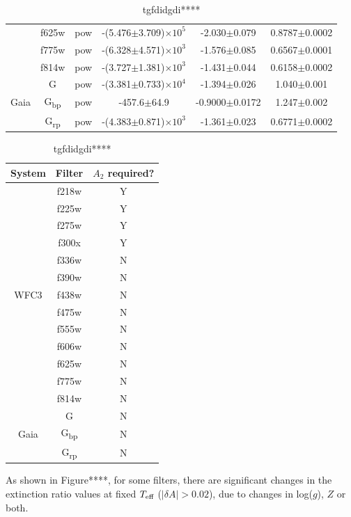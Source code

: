 \documentclass[12pt, a4paper]{report}
\begin{document}
\begin{table}
\begin{tabular}{cccccc}
& f625w & pow & -(5.476$\pm$3.709)$\times 10^{5}$ & -2.030$\pm$0.079 & 0.8787$\pm$0.0002 \\
& f775w & pow & -(6.328$\pm$4.571)$\times 10^{3}$ & -1.576$\pm$0.085 & 0.6567$\pm$0.0001 \\
& f814w & pow & -(3.727$\pm$1.381)$\times 10^{3}$ & -1.431$\pm$0.044 & 0.6158$\pm$0.0002 \\ \hline
& G & pow & -(3.381$\pm$0.733)$\times 10^{4}$ & -1.394$\pm$0.026 & 1.040$\pm$0.001 \\
Gaia & G\textsubscript{bp} & pow & -457.6$\pm$64.9 & -0.9000$\pm$0.0172 & 1.247$\pm$0.002 \\
& G\textsubscript{rp} & pow & -(4.383$\pm$0.871)$\times 10^{3}$ & -1.361$\pm$0.023 & 0.6771$\pm$0.0002 \\ \hline

\end{tabular}
\caption{tgfdidgdi****}
\label{R1_coeffs_table}
\end{table}

\begin{table}
\begin{tabular}{ccc}
\hline
System & Filter & $A_{2}$ required? \\
\hline
& f218w & Y \\
& f225w & Y \\
& f275w & Y \\
& f300x & Y \\
& f336w & N \\
& f390w & N \\
WFC3 & f438w & N \\
& f475w & N \\
& f555w & N \\
& f606w & N \\
& f625w & N \\
& f775w & N \\
& f814w & N \\
\hline
& G & N \\
Gaia & G\textsubscript{bp} & N \\
& G\textsubscript{rp} & N \\ \hline

\end{tabular}
\caption{tgfdidgdi****}
\label{R2_yn_table}
\end{table}

As shown in Figure****, for some filters, there are significant changes in the extinction ratio values at fixed $T_{\textnormal{eff}}$ ($|\delta A| > 0.02$), due to changes in log($g$), $Z$ or both. 
\end{document}
